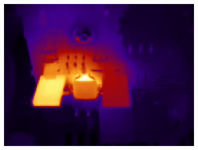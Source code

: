\documentclass[12pt,twoside,a4paper,titlepage]{report}
\begin{document}
\begin{figure}[ht]
 \centering
 \includegraphics[width=10cm, keepaspectratio=true width=10cm]{img/tools_scale_exported}

\end{figure}
\end{document}
